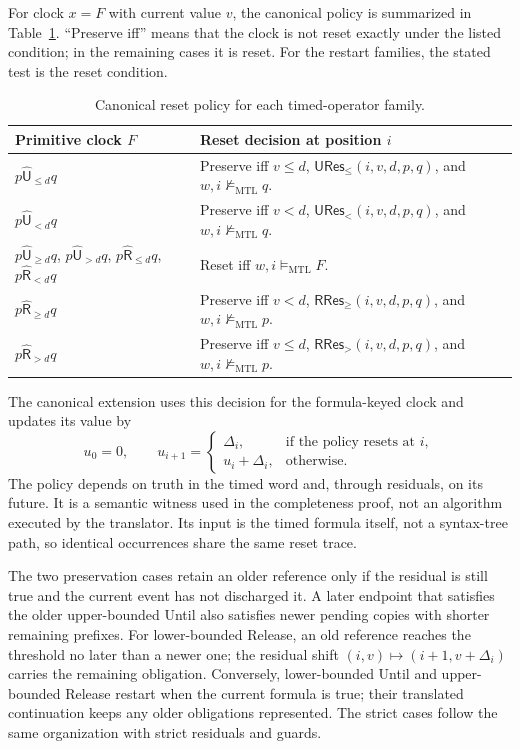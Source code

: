 \documentclass[10pt,journal,compsoc]{IEEEtran}
\newcommand{\satM}{\models_{\mathrm{MTL}}}
\newcommand{\hUntil}{\mathbin{\widehat{\mathsf{U}}}}
\newcommand{\hRelease}{\mathbin{\widehat{\mathsf{R}}}}
\begin{document}
For clock $x=F$ with current value $v$, the canonical policy is summarized
in Table~\ref{tab:canonical-policy}. ``Preserve iff'' means that the clock is
not reset exactly under the listed condition; in the remaining cases it is
reset. For the restart families, the stated test is the reset condition.
\begin{table}[t]
\centering
\caption{Canonical reset policy for each timed-operator family.}
\label{tab:canonical-policy}
\footnotesize
\begin{tabular}{@{}p{}p{}@{}}
\toprule
Primitive clock $F$ & Reset decision at position $i$\\
\midrule
$p\hUntil_{\le d}q$ &
Preserve iff $v\le d$, $\mathsf{URes}_{\le}(i,v,d,p,q)$, and
$w,i\not\satM q$.\\
$p\hUntil_{<d}q$ &
Preserve iff $v<d$, $\mathsf{URes}_{<}(i,v,d,p,q)$, and
$w,i\not\satM q$.\\
$p\hUntil_{\ge d}q$, $p\hUntil_{>d}q$,
$p\hRelease_{\le d}q$, $p\hRelease_{<d}q$ &
Reset iff $w,i\satM F$.\\
$p\hRelease_{\ge d}q$ &
Preserve iff $v<d$, $\mathsf{RRes}_{\ge}(i,v,d,p,q)$, and
$w,i\not\satM p$.\\
$p\hRelease_{>d}q$ &
Preserve iff $v\le d$, $\mathsf{RRes}_{>}(i,v,d,p,q)$, and
$w,i\not\satM p$.\\
\bottomrule
\end{tabular}
\end{table}
The canonical extension uses this decision for the formula-keyed clock and
updates its value by
\[
u_0=0,\qquad
u_{i+1}=
\begin{cases}
\Delta_i,&\text{if the policy resets at }i,\\
u_i+\Delta_i,&\text{otherwise.}
\end{cases}
\]
The policy depends on truth in the timed word and, through residuals, on its
future. It is a semantic witness used in the completeness proof, not an
algorithm executed by the translator. Its input is the timed formula itself,
not a syntax-tree path, so identical occurrences share the same reset trace.

The two preservation cases retain an older reference only if the residual
is still true and the current event has not discharged it. A later endpoint
that satisfies the older upper-bounded Until also satisfies newer pending
copies with shorter remaining prefixes. For lower-bounded Release, an old
reference reaches the threshold no later than a newer one; the residual
shift $(i,v)\mapsto(i+1,v+\Delta_i)$ carries the remaining obligation.
Conversely, lower-bounded Until and upper-bounded Release restart when the
current formula is true; their translated continuation keeps any older
obligations represented. The strict cases follow the same organization with
strict residuals and guards.
\end{document}
